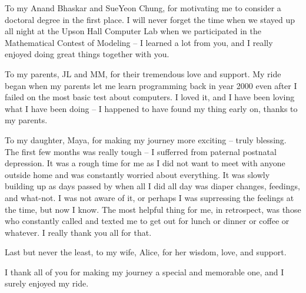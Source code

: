 To my Anand Bhaskar and SueYeon Chung, for motivating me to consider a doctoral degree in the first place. I will never forget the time when we stayed up all night at the Upson Hall Computer Lab when we participated in the Mathematical Contest of Modeling -- I learned a lot from you, and I really enjoyed doing great things together with you. 

To my parents, JL and MM, for their tremendous love and support. My ride began when my parents let me learn programming back in year 2000 even after I failed on the most basic test about computers. I loved it, and I have been loving what I have been doing -- I happened to have found my thing early on, thanks to my parents. 

To my daughter, Maya, for making my journey more exciting -- truly blessing. The first few months was really tough -- I sufferred from paternal postnatal depression. It was a rough time for me as I did not want to meet with anyone outside home and was constantly worried about everything. It was slowly building up as days passed by when all I did all day was diaper changes, feedings, and what-not. I was not aware of it, or perhaps I was suprressing the feelings at the time, but now I know. The most helpful thing for me, in retrospect, was those who constantly called and texted me to get out for lunch or dinner or coffee or whatever. I really thank you all for that.

Last but never the least, to my wife, Alice, for her wisdom, love, and support. 

I thank all of you for making my journey a special and memorable one, and I surely enjoyed my ride.


